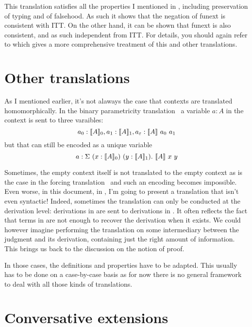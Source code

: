 This translation satisfies all the properties I mentioned in
, including preservation of typing and of falsehood.
As such it shows that the negation of \acrshort{funext} is consistent with
\acrshort{ITT}. On the other hand, it can be shown that \acrshort{funext} is
also consistent, and as such independent from \acrshort{ITT}.
For details, you should again refer to
which gives a more comprehensive treatment of this and other translations.

\section{Other translations}

As I mentioned earlier, it's not alaways the case that contexts are translated
homomorphically. In the binary parametricity
translation~ a variable
\(a : A\) in the context is sent to three varaibles:
\[
  a_0 : \llbracket A \rrbracket_0, a_1 : \llbracket A \rrbracket_1, a_\varepsilon : \llbracket A \rrbracket\ a_0\ a_1
\]
but that can still be encoded as a unique variable
\[
  a : \Sigma\ (x : \llbracket A \rrbracket_0)\ (y : \llbracket A \rrbracket_1).\ \llbracket A \rrbracket\ x\ y
\]

Sometimes, the empty context itself is not translated to the empty context
as is the case in the forcing translation~ and
such an encoding becomes impossible.
Even worse, in this document, in , I'm going to
present a translation that isn't even syntactic! Indeed, sometimes the
translation can only be conducted at the derivation level: derivations in \cS
are sent to derivations in \cT. It often reflects the fact that terms in \cS are
not enough to recover the derivation when it exists.
We could however imagine performing the translation on some intermediary between
the judgment and its derivation, containing just the right amount of
information. This brings us back to the discussion on the notion of
proof.

In those cases, the definitions and properties have to be adapted. This usually
has to be done on a case-by-case basis as for now there is no general framework
to deal with all those kinds of translations.

\section{Conversative extensions}

